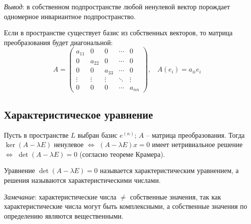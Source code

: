 \textit{Вывод}: в собственном подпространстве любой ненулевой вектор порождает одномерное инвариантное подпространство.

Если в пространстве  существует базис из собственных векторов, то матрица преобразования будет диагональной:
\[
A = \begin{pmatrix}
a_{11} & 0 & 0 & \cdots & 0 \\
0 & a_{22} & 0 & \cdots & 0 \\
0 & 0 & a_{33} & \cdots & 0 \\
\vdots & \vdots & \vdots & \ddots & \vdots \\
0 & 0 & 0 & \cdots & a_{nn}
\end{pmatrix}, \ \ \ \ A(e_i)=a_{ii}e_i
\]
\subsection{Характеристическое уравнение}

Пусть в пространстве $L$ выбран базис $e^{(n)}$; $A$ -- матрица преобразования. Тогда $\ker (A-\lambda E)$ ненулевое $\Leftrightarrow$ $(A-\lambda E)x=0$ имеет нетривиальное решение $\Leftrightarrow$ $\det (A-\lambda E)=0$ (согласно теореме Крамера).
\begin{definition}
    Уравнение $\det (A-\lambda E)=0$ называется характеристическим уравнением, а решения называются характеристическими числами.
\end{definition}
\textit{Замечание}: характеристические числа $\neq$ собственные значения, так как характеристические числа могут быть комплексными, а собственные значения по определению являются вещественными.